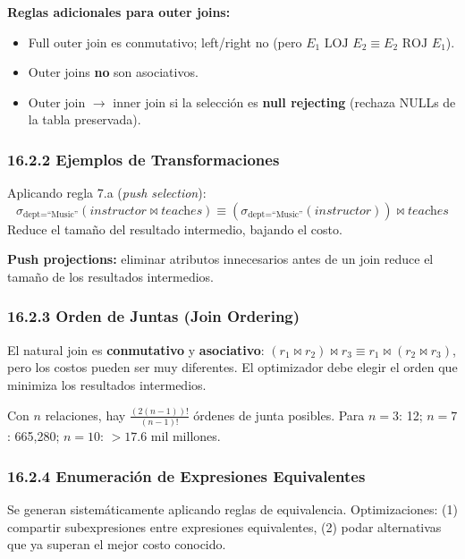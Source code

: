 \documentclass[11pt, a4paper]{article}
\begin{document}
\textbf{Reglas adicionales para outer joins:}
\begin{itemize}[nosep]
	\item Full outer join es conmutativo; left/right no (pero $E_1 \text{ LOJ } E_2 \equiv E_2 \text{ ROJ } E_1$).
	\item Outer joins \textbf{no} son asociativos.
	\item Outer join $\to$ inner join si la selección es \textbf{null rejecting} (rechaza NULLs de la tabla preservada).
\end{itemize}

\subsubsection{16.2.2 Ejemplos de Transformaciones}

Aplicando regla 7.a (\textit{push selection}):
\[
	\sigma_{\text{dept}=\text{``Music''}}(\textit{instructor} \bowtie \textit{teaches}) \equiv (\sigma_{\text{dept}=\text{``Music''}}(\textit{instructor})) \bowtie \textit{teaches}
\]
Reduce el tamaño del resultado intermedio, bajando el costo.

\textbf{Push projections:} eliminar atributos innecesarios antes de un join reduce el tamaño de los resultados intermedios.

\subsubsection{16.2.3 Orden de Juntas (Join Ordering)}

El natural join es \textbf{conmutativo} y \textbf{asociativo}: $(r_1 \bowtie r_2) \bowtie r_3 \equiv r_1 \bowtie (r_2 \bowtie r_3)$, pero los costos pueden ser muy diferentes. El optimizador debe elegir el orden que minimiza los resultados intermedios.

Con $n$ relaciones, hay $\frac{(2(n-1))!}{(n-1)!}$ órdenes de junta posibles. Para $n = 3$: 12; $n = 7$: 665,280; $n = 10$: $> 17.6$ mil millones.

\subsubsection{16.2.4 Enumeración de Expresiones Equivalentes}

Se generan sistemáticamente aplicando reglas de equivalencia. Optimizaciones: (1) compartir subexpresiones entre expresiones equivalentes, (2) podar alternativas que ya superan el mejor costo conocido.

\end{document}
